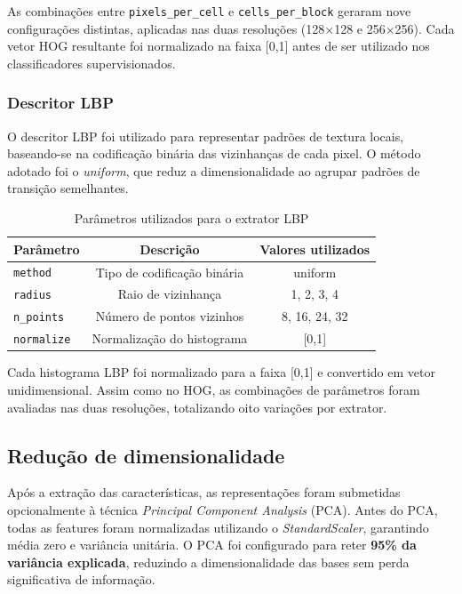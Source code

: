\documentclass[12pt]{article}
\begin{document}
As combinações entre \texttt{pixels\_per\_cell} e \texttt{cells\_per\_block} geraram nove configurações distintas, aplicadas nas duas resoluções (128×128 e 256×256). Cada vetor HOG resultante foi normalizado na faixa [0,1] antes de ser utilizado nos classificadores supervisionados.

\subsubsection{Descritor LBP}

O descritor LBP foi utilizado para representar padrões de textura locais, baseando-se na codificação binária das vizinhanças de cada pixel. O método adotado foi o \textit{uniform}, que reduz a dimensionalidade ao agrupar padrões de transição semelhantes.

\begin{table}[H]
\centering
\caption{Parâmetros utilizados para o extrator LBP}
\label{tab:lbp_parametros}
\begin{tabular}{lcc}
\toprule
\textbf{Parâmetro} & \textbf{Descrição} & \textbf{Valores utilizados} \\
\midrule
\texttt{method} & Tipo de codificação binária & uniform \\
\texttt{radius} & Raio de vizinhança & 1, 2, 3, 4 \\
\texttt{n\_points} & Número de pontos vizinhos & 8, 16, 24, 32 \\
\texttt{normalize} & Normalização do histograma & [0,1] \\
\bottomrule
\end{tabular}
\end{table}

Cada histograma LBP foi normalizado para a faixa [0,1] e convertido em vetor unidimensional. Assim como no HOG, as combinações de parâmetros foram avaliadas nas duas resoluções, totalizando oito variações por extrator.

\subsection{Redução de dimensionalidade}

Após a extração das características, as representações foram submetidas opcionalmente à técnica \textit{Principal Component Analysis} (PCA). Antes do PCA, todas as features foram normalizadas utilizando o \textit{StandardScaler}, garantindo média zero e variância unitária. O PCA foi configurado para reter \textbf{95\% da variância explicada}, reduzindo a dimensionalidade das bases sem perda significativa de informação.
\end{document}
